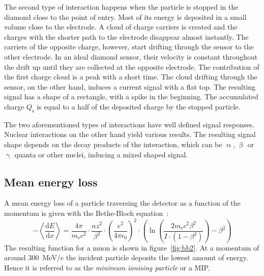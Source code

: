 The second type of interaction happens when the particle is stopped in the diamond close to the point of entry. Most of its energy is deposited in a small volume close to the electrode. A cloud of charge carriers is created and the charges with the shorter path to the electrode disappear almost instantly. The carriers of the opposite charge, however, start drifting through the sensor to the other electrode. In an ideal diamond sensor, their velocity is constant throughout the drift up until they are collected at the opposite electrode. The contribution of the first charge cloud is a peak with a short time. The cloud drifting through the sensor, on the other hand, induces a current signal with a flat top. The resulting signal has a shape of a rectangle, with a spike in the beginning. %
The accumulated charge $Q_\mathrm{s}$ is equal to a half of the deposited charge by the stopped particle.

The two aforementioned types of interactions have well defined signal responses. Nuclear interactions on the other hand yield various results. The resulting signal shape depends on the decay products of the interaction, which can be $\upalpha$, $\upbeta$ or $\upgamma$ quanta or other nuclei, inducing a mixed shaped signal. 


\subsection{Mean energy loss}
A mean energy loss of a particle traversing the detector as a function of the momentum is given with the Bethe-Bloch equation~\cite{BETHE:00001}: 
\begin{equation}
-\left\langle\frac{\mathrm{d}E}{\mathrm{d}x}\right\rangle = \frac{4\pi}{m_\mathrm{e}c^2}  \cdot \frac{nz^2}{\beta^2}  \cdot  \left(\frac{e^2}{4\pi\epsilon_\mathrm{0}}\right)^2  \cdot  \left( \ln \left(\frac{2m_\mathrm{e}c^2\beta^2}{I\cdot(1-\beta^2)}\right)-\beta^2  \right)
\label{eq:bethebloch}
\end{equation}
The resulting function for a muon is shown in figure~\ref{fig:bb2}. At a momentum of around 300~MeV/c the incident particle deposits the lowest amount of energy. Hence it is referred to as the \emph{minimum ionising particle} or a MIP.


